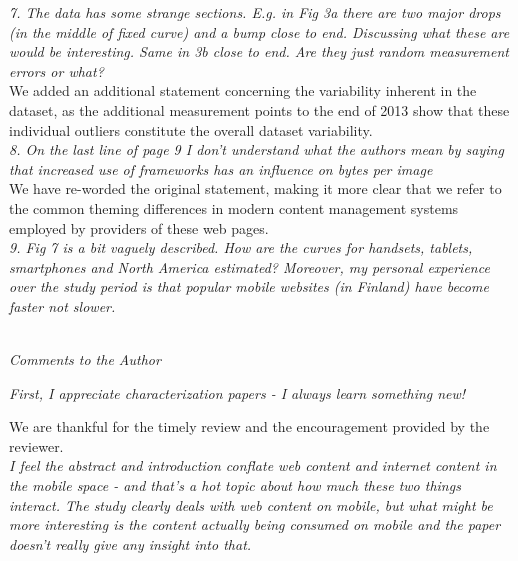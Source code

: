 \documentclass[11pt, draftclsnofoot, onecolumn]{IEEEtran}
\begin{document}
{{\noindent \textit{7. The data has some strange sections. E.g. in Fig 3a there are two major drops (in the middle of fixed curve) and a bump close to end. Discussing what these are would be interesting. Same in 3b close to end. Are they just random measurement errors or what?}\\
We added an additional statement concerning the variability inherent in the dataset, as the additional measurement points to the end of 2013 show that these individual outliers constitute the overall dataset variability.\\

\noindent \textit{8. On the last line of page 9 I don't understand what the authors mean by saying that increased use of frameworks has an influence on bytes per image}\\
We have re-worded the original statement, making it more clear that we refer to the common theming differences in modern content management systems employed by providers of these web pages.\\


\noindent \textit{9. Fig 7 is a bit vaguely described. How are the curves for handsets, tablets, smartphones and North America estimated? Moreover, my personal experience over the study period is that popular mobile websites (in Finland) have become faster not slower.}\\







~\\


\noindent \textit{Comments to the Author}



\noindent \textit{First, I appreciate characterization papers - I always learn something new!}

We are thankful for the timely review and the encouragement provided by the reviewer.
\\

\noindent \textit{I feel the abstract and introduction conflate web content and internet content in the mobile space - and that's a hot topic about how much these two things interact. The study clearly deals with web content on mobile, but what might be more interesting is the content actually being consumed on mobile and the paper doesn't really give any insight into that.}

}}
\end{document}
